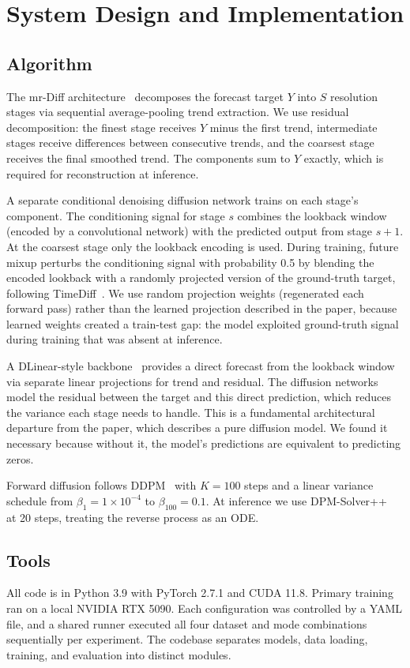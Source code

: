 \documentclass[conference]{IEEEtran}
\begin{document}
\section{System Design and Implementation}

\subsection{Algorithm}
The mr-Diff architecture~\cite{mrdiff} decomposes the forecast target $Y$ into $S$ resolution stages via sequential average-pooling trend extraction. We use residual decomposition: the finest stage receives $Y$ minus the first trend, intermediate stages receive differences between consecutive trends, and the coarsest stage receives the final smoothed trend. The components sum to $Y$ exactly, which is required for reconstruction at inference.

A separate conditional denoising diffusion network trains on each stage's component. The conditioning signal for stage $s$ combines the lookback window (encoded by a convolutional network) with the predicted output from stage $s{+}1$. At the coarsest stage only the lookback encoding is used. During training, future mixup perturbs the conditioning signal with probability 0.5 by blending the encoded lookback with a randomly projected version of the ground-truth target, following TimeDiff~\cite{timediff}. We use random projection weights (regenerated each forward pass) rather than the learned projection described in the paper, because learned weights created a train-test gap: the model exploited ground-truth signal during training that was absent at inference.

A DLinear-style backbone~\cite{dlinear} provides a direct forecast from the lookback window via separate linear projections for trend and residual. The diffusion networks model the residual between the target and this direct prediction, which reduces the variance each stage needs to handle. This is a fundamental architectural departure from the paper, which describes a pure diffusion model. We found it necessary because without it, the model's predictions are equivalent to predicting zeros.

Forward diffusion follows DDPM~\cite{ddpm} with $K{=}100$ steps and a linear variance schedule from $\beta_1 = 1 \times 10^{-4}$ to $\beta_{100} = 0.1$. At inference we use DPM-Solver++~\cite{dpmsolver} at 20 steps, treating the reverse process as an ODE.

\subsection{Tools}
All code is in Python 3.9 with PyTorch 2.7.1 and CUDA 11.8. Primary training ran on a local NVIDIA RTX 5090. Each configuration was controlled by a YAML file, and a shared runner executed all four dataset and mode combinations sequentially per experiment. The codebase separates models, data loading, training, and evaluation into distinct modules.
\end{document}
